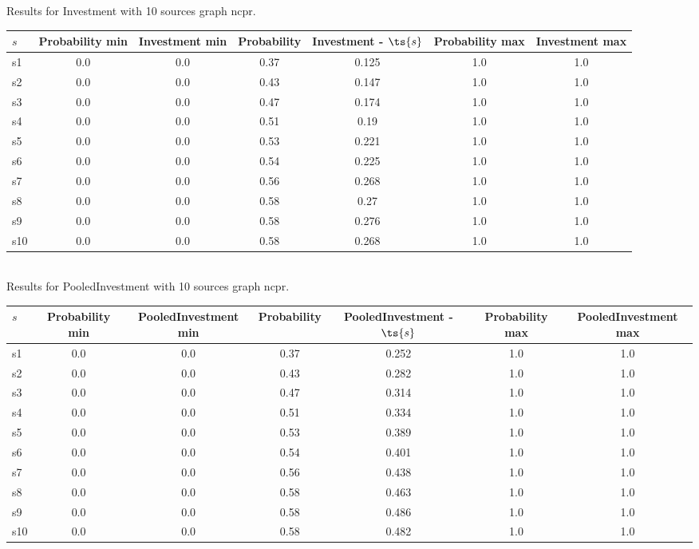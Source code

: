 \documentclass{article}
\begin{document}
\noindent Results for Investment with 10 sources graph ncpr.

\noindent\begin{tabular}{|l|c|c|c|c|c|c|}
\hline
$s$& Probability min & Investment min & Probability & Investment - $\ts{s}$ & Probability max & Investment max\\
\hline
s1 &0.0 & 0.0 & 0.37 & 0.125 & 1.0 & 1.0\\
\hline
s2 &0.0 & 0.0 & 0.43 & 0.147 & 1.0 & 1.0\\
\hline
s3 &0.0 & 0.0 & 0.47 & 0.174 & 1.0 & 1.0\\
\hline
s4 &0.0 & 0.0 & 0.51 & 0.19 & 1.0 & 1.0\\
\hline
s5 &0.0 & 0.0 & 0.53 & 0.221 & 1.0 & 1.0\\
\hline
s6 &0.0 & 0.0 & 0.54 & 0.225 & 1.0 & 1.0\\
\hline
s7 &0.0 & 0.0 & 0.56 & 0.268 & 1.0 & 1.0\\
\hline
s8 &0.0 & 0.0 & 0.58 & 0.27 & 1.0 & 1.0\\
\hline
s9 &0.0 & 0.0 & 0.58 & 0.276 & 1.0 & 1.0\\
\hline
s10 &0.0 & 0.0 & 0.58 & 0.268 & 1.0 & 1.0\\
\hline
\end{tabular}\\

\noindent Results for PooledInvestment with 10 sources graph ncpr.

\noindent\begin{tabular}{|l|c|c|c|c|c|c|}
\hline
$s$& Probability min & PooledInvestment min & Probability & PooledInvestment - $\ts{s}$ & Probability max & PooledInvestment max\\
\hline
s1 &0.0 & 0.0 & 0.37 & 0.252 & 1.0 & 1.0\\
\hline
s2 &0.0 & 0.0 & 0.43 & 0.282 & 1.0 & 1.0\\
\hline
s3 &0.0 & 0.0 & 0.47 & 0.314 & 1.0 & 1.0\\
\hline
s4 &0.0 & 0.0 & 0.51 & 0.334 & 1.0 & 1.0\\
\hline
s5 &0.0 & 0.0 & 0.53 & 0.389 & 1.0 & 1.0\\
\hline
s6 &0.0 & 0.0 & 0.54 & 0.401 & 1.0 & 1.0\\
\hline
s7 &0.0 & 0.0 & 0.56 & 0.438 & 1.0 & 1.0\\
\hline
s8 &0.0 & 0.0 & 0.58 & 0.463 & 1.0 & 1.0\\
\hline
s9 &0.0 & 0.0 & 0.58 & 0.486 & 1.0 & 1.0\\
\hline
s10 &0.0 & 0.0 & 0.58 & 0.482 & 1.0 & 1.0\\
\hline
\end{tabular}\\
\end{document}
